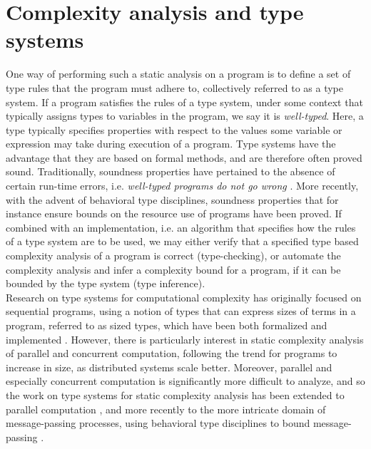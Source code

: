 \section{Complexity analysis and type systems}
One way of performing such a static analysis on a program is to define a set of type rules that the program must adhere to, collectively referred to as a type system. If a program satisfies the rules of a type system, under some context that typically assigns types to variables in the program, we say it is \textit{well-typed}. Here, a type typically specifies properties with respect to the values some variable or expression may take during execution of a program. Type systems have the advantage that they are based on formal methods, and are therefore often proved sound. Traditionally, soundness properties have pertained to the absence of certain run-time errors, i.e. \textit{well-typed programs do not go wrong} \cite{Milner1978}. More recently, with the advent of behavioral type disciplines, soundness properties that for instance ensure bounds on the resource use of programs have been proved. If combined with an implementation, i.e. an algorithm that specifies how the rules of a type system are to be used, we may either verify that a specified type based complexity analysis of a program is correct (type-checking), or automate the complexity analysis and infer a complexity bound for a program, if it can be bounded by the type system (type inference). \\

Research on type systems for computational complexity has originally focused on sequential programs, using a notion of types that can express sizes of terms in a program, referred to as sized types, which have been both formalized and implemented \cite{HofmannAndJost2003,HofmannAndHoffmann2010,HoffmannEtAl2012,LagoGaboardi2012,AvanziniLago2017}. However, there is particularly interest in static complexity analysis of parallel and concurrent computation, following the trend for programs to increase in size, as distributed systems scale better. Moreover, parallel and especially concurrent computation is significantly more difficult to analyze, and so the work on type systems for static complexity analysis has been extended to parallel computation \cite{HoffmannShao2015}, and more recently to the more intricate domain of message-passing processes, using behavioral type disciplines to bound message-passing \cite{BaillotGhyselen2021,BaillotEtAl2021}.\\ 

